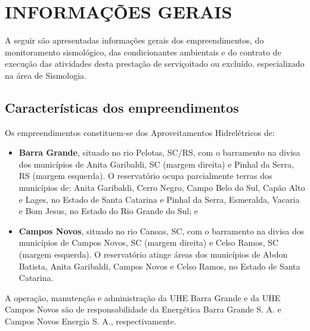 \section{INFORMAÇÕES GERAIS}
A seguir são apresentadas informações gerais dos empreendimentos, do monitoramento sismológico, das condicionantes ambientais e do contrato de execução das atividades desta prestação de serviçoitado ou excluído. especializado na área de Sismologia.

\subsection{Características dos empreendimentos}
Os empreendimentos constituem-se dos Aproveitamentos Hidrelétricos de:
\begin{itemize}
    \item \textbf{Barra Grande}, situado no rio Pelotas, SC/RS, com o barramento na divisa dos municípios de Anita Garibaldi, SC (margem direita) e Pinhal da Serra, RS (margem esquerda). O reservatório ocupa parcialmente terras dos municípios de: Anita Garibaldi, Cerro Negro, Campo Belo do Sul, Capão Alto e Lages, no Estado de Santa Catarina e Pinhal da Serra, Esmeralda, Vacaria e Bom Jesus, no Estado do Rio Grande do Sul; e
    \item \textbf{Campos Novos}, situado no rio Canoas, SC, com o barramento na divisa dos municípios de Campos Novos, SC (margem direita) e Celso Ramos, SC (margem esquerda). O reservatório atinge áreas dos municípios de Abdon Batista, Anita Garibaldi, Campos Novos e Celso Ramos, no Estado de Santa Catarina.
\end{itemize}

A operação, manutenção e administração da UHE Barra Grande e da UHE Campos Novos são de responsabilidade da Energética Barra Grande S. A. e Campos Novos Energia S. A., respectivamente.


